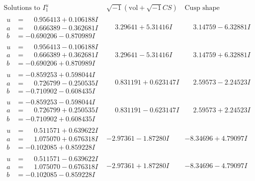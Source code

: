\documentclass[1p]{elsarticle_modified}
\theoremstyle{definition}
\newcommand{\I}{\sqrt{-1}}
\begin{document}
$$\begin{array}{c|c|c}  
\text{Solutions to }I^u_{1}& \I (\text{vol} + \sqrt{-1}CS) & \text{Cusp shape}\\
 \hline 
\begin{aligned}
u &= \phantom{-}0.956413 + 0.106188 I \\
a &= \phantom{-}0.666389 - 0.362681 I \\
b &= -0.690206 - 0.870989 I\end{aligned}
 & \phantom{-}3.29641 + 5.31416 I & \phantom{-}3.14759 - 6.32881 I \\ \hline\begin{aligned}
u &= \phantom{-}0.956413 - 0.106188 I \\
a &= \phantom{-}0.666389 + 0.362681 I \\
b &= -0.690206 + 0.870989 I\end{aligned}
 & \phantom{-}3.29641 - 5.31416 I & \phantom{-}3.14759 + 6.32881 I \\ \hline\begin{aligned}
u &= -0.859253 + 0.598044 I \\
a &= \phantom{-}0.726799 - 0.250535 I \\
b &= -0.710902 - 0.608435 I\end{aligned}
 & \phantom{-}0.831191 + 0.623147 I & \phantom{-}2.59573 - 2.24523 I \\ \hline\begin{aligned}
u &= -0.859253 - 0.598044 I \\
a &= \phantom{-}0.726799 + 0.250535 I \\
b &= -0.710902 + 0.608435 I\end{aligned}
 & \phantom{-}0.831191 - 0.623147 I & \phantom{-}2.59573 + 2.24523 I \\ \hline\begin{aligned}
u &= \phantom{-}0.511571 + 0.639622 I \\
a &= \phantom{-}1.075070 + 0.676318 I \\
b &= -0.102085 + 0.859228 I\end{aligned}
 & -2.97361 - 1.87280 I & -8.34696 + 4.79097 I \\ \hline\begin{aligned}
u &= \phantom{-}0.511571 - 0.639622 I \\
a &= \phantom{-}1.075070 - 0.676318 I \\
b &= -0.102085 - 0.859228 I\end{aligned}
 & -2.97361 + 1.87280 I & -8.34696 - 4.79097 I \\ \hline\begin{aligned}

\end{aligned}
\end{array}$$
\end{document}
